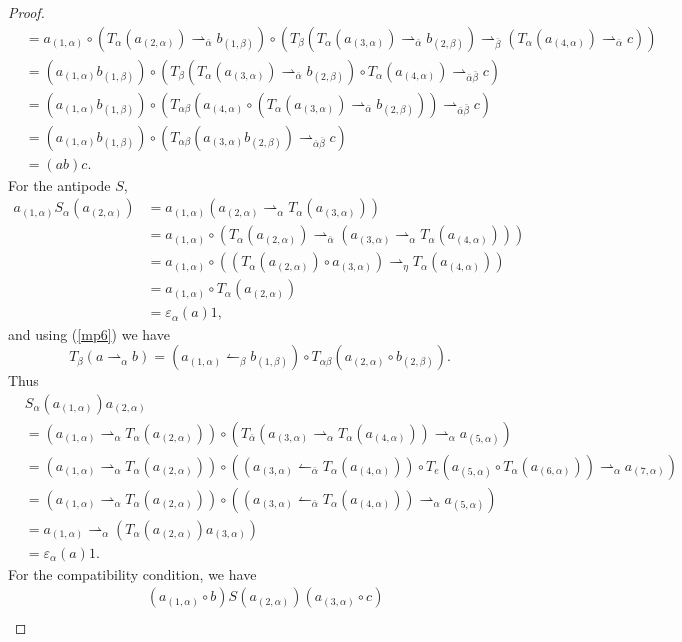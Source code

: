 \documentclass[11pt]{article}
\def\a{\alpha}
\def\b{\beta}
\def\e{\eta}
\def\v{\varepsilon}
\begin{document}
\begin{proof}
\begin{align*}
&=a_{(1,\a)}\circ(T_\a(a_{(2,\a)})\rightharpoonup_{\bar{\a}}b_{(1,\b)})\circ (T_\b(T_\a(a_{(3,\a)})\rightharpoonup_{\bar{\a}}b_{(2,\b)})\rightharpoonup_{\bar{\b}}(T_\a(a_{(4,\a)})\rightharpoonup_{\bar{\a}}c))\\
&=(a_{(1,\a)}b_{(1,\b)})\circ(T_\b(T_\a(a_{(3,\a)})\rightharpoonup_{\bar{\a}}b_{(2,\b)})\circ T_\a(a_{(4,\a)})\rightharpoonup_{\bar{\a}\bar{\b}}c)\\
&=(a_{(1,\a)}b_{(1,\b)})\circ(T_{\a\b}(a_{(4,\a)}\circ (T_\a(a_{(3,\a)})\rightharpoonup_{\bar{\a}}b_{(2,\b)})) \rightharpoonup_{\bar{\a}\bar{\b}}c)\\
&=(a_{(1,\a)}b_{(1,\b)})\circ(T_{\a\b}(a_{(3,\a)}b_{(2,\b)}) \rightharpoonup_{\bar{\a}\bar{\b}}c)\\
&=(ab)c.
\end{align*}
For the antipode $S$,
\begin{align*}
a_{(1,\a)}S_\a(a_{(2,\a)})&=a_{(1,\a)}(a_{(2,\a)}\rightharpoonup_\a T_\a(a_{(3,\a)}))\\
&=a_{(1,\a)}\circ(T_\a(a_{(2,\a)})\rightharpoonup_{\bar{\a}}(a_{(3,\a)}\rightharpoonup_\a T_\a(a_{(4,\a)})))\\
&=a_{(1,\a)}\circ((T_\a(a_{(2,\a)})\circ a_{(3,\a)})\rightharpoonup_\e T_\a(a_{(4,\a)}))\\
&=a_{(1,\a)}\circ T_\a(a_{(2,\a)})\\
&=\v_\a(a)1,
\end{align*}
and using (\ref{mp6}) we have
$$T_\b(a\rightharpoonup_\a b)=(a_{(1,\a)}\leftharpoonup_\b b_{(1,\b)})\circ T_{\a\b}(a_{(2,\a)}\circ b_{(2,\b)}).$$
Thus
\begin{align*}
&S_\a(a_{(1,\a)})a_{(2,\a)}\\
&=(a_{(1,\a)}\rightharpoonup_\a T_\a(a_{(2,\a)}))\circ(T_{\bar{\a}}(a_{(3,\a)}\rightharpoonup_\a T_\a(a_{(4,\a)}))\rightharpoonup_\a a_{(5,\a)})\\
&=(a_{(1,\a)}\rightharpoonup_\a T_\a(a_{(2,\a)}))\circ((a_{(3,\a)}\leftharpoonup_{\bar{\a}}T_\a(a_{(4,\a)}))\circ T_{e}(a_{(5,\a)}\circ T_\a(a_{(6,\a)}))\rightharpoonup_\a a_{(7,\a)})\\
&=(a_{(1,\a)}\rightharpoonup_\a T_\a(a_{(2,\a)}))\circ((a_{(3,\a)}\leftharpoonup_{\bar{\a}}T_\a(a_{(4,\a)}))\rightharpoonup_\a a_{(5,\a)})\\
&=a_{(1,\a)}\rightharpoonup_\a( T_\a(a_{(2,\a)})a_{(3,\a)})\\
&=\v_\a(a)1.
\end{align*}
For the compatibility condition, we have
\begin{align*}
&(a_{(1,\a)}\circ b)S(a_{(2,\a)})(a_{(3,\a)}\circ c)\\

\end{align*}
\end{proof}
\end{document}
